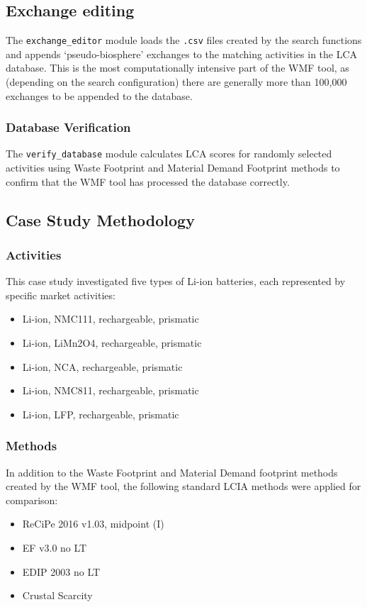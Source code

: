 \subsection{Exchange editing}
The \texttt{exchange\_editor} module loads the \texttt{.csv} files created by the search functions and appends `pseudo-biosphere' exchanges to the matching activities in the LCA database. This is the most computationally intensive part of the WMF tool, as (depending on the search configuration) there are generally more than 100,000 exchanges to be appended to the database. 

\subsubsection{Database Verification}
The \texttt{verify\_database} module calculates LCA scores for randomly selected activities using Waste Footprint and Material Demand Footprint methods to confirm that the WMF tool has processed the database correctly.

\subsection{Case Study Methodology}
\label{sec:method-case_study}

\subsubsection{Activities}
This case study investigated five types of Li-ion batteries, each represented by specific market activities:
\begin{itemize}[itemsep=0pt]
    \item Li-ion, NMC111, rechargeable, prismatic
    \item Li-ion, LiMn2O4, rechargeable, prismatic
    \item Li-ion, NCA, rechargeable, prismatic
    \item Li-ion, NMC811, rechargeable, prismatic
    \item Li-ion, LFP, rechargeable, prismatic
\end{itemize}

\subsubsection{Methods}
In addition to the Waste Footprint and Material Demand footprint methods created by the WMF tool, the following standard LCIA methods were applied for comparison:
\begin{itemize}[itemsep=0pt]
    \item ReCiPe 2016 v1.03, midpoint (I)
    \item EF v3.0 no LT
    \item EDIP 2003 no LT
    \item Crustal Scarcity
\end{itemize}

